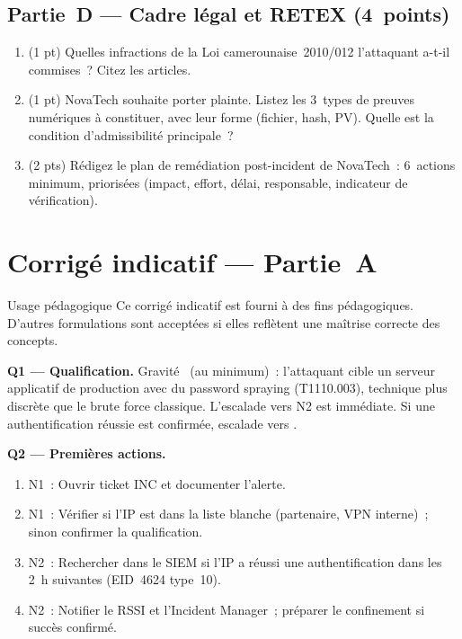 \subsection{Partie~D --- Cadre légal et RETEX (4~points)}

\begin{boxexo}
\begin{enumerate}[label=\textbf{Q\arabic*.}]
  \item (1 pt) Quelles infractions de la Loi camerounaise~2010/012
        l'attaquant a-t-il commises~? Citez les articles.
  \item (1 pt) NovaTech souhaite porter plainte. Listez les 3~types
        de preuves numériques à constituer, avec leur forme
        (fichier, hash, PV). Quelle est la condition d'admissibilité
        principale~?
  \item (2 pts) Rédigez le plan de remédiation post-incident de NovaTech~:
        6~actions minimum, priorisées (impact, effort, délai,
        responsable, indicateur de vérification).
\end{enumerate}
\end{boxexo}

\section{Corrigé indicatif --- Partie~A}
\label{sec:corrige-partieA}

\begin{boiteRemarque}{Usage pédagogique}
Ce corrigé indicatif est fourni à des fins pédagogiques. D'autres
formulations sont acceptées si elles reflètent une maîtrise correcte
des concepts.
\end{boiteRemarque}

\textbf{Q1 — Qualification.}
Gravité~ (au minimum)~: l'attaquant cible un serveur
applicatif de production avec du password spraying (T1110.003), technique
plus discrète que le brute force classique. L'escalade vers N2 est
immédiate. Si une authentification réussie est confirmée, escalade vers
.

\textbf{Q2 — Premières actions.}
\begin{enumerate}
  \item N1~: Ouvrir ticket INC et documenter l'alerte.
  \item N1~: Vérifier si l'IP est dans la liste blanche
        (partenaire, VPN interne)~; sinon confirmer la qualification.
  \item N2~: Rechercher dans le SIEM si l'IP a réussi une authentification
        dans les 2~h suivantes (EID~4624 type~10).
  \item N2~: Notifier le RSSI et l'Incident Manager~; préparer
        le confinement si succès confirmé.
\end{enumerate}

